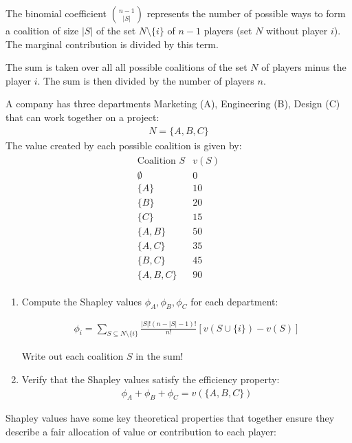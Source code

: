 The binomial coefficient $\binom{n-1}{|S|}$ represents the number of possible ways to form a coalition of size $|S|$ of the set $N \setminus \{i\}$ of $n-1$ players (set $N$ without player $i$). The marginal contribution is divided by this term. 

The sum is taken over all all possible coalitions of the set $N$ of players minus the player $i$. The sum is then divided by the number of players $n$.


\begin{exerciseboxpaper}
A company has three departments Marketing (A), Engineering (B), Design (C) that can work together on a project:
\begin{align*}
N=\{A,B,C\}
\end{align*}
The value created by each possible coalition is given by:
\begin{align*}
\begin{array}{c|c}
\text{Coalition } S & v(S) \\
\hline
\emptyset & 0 \\
\{A\} & 10 \\
\{B\} & 20 \\
\{C\} & 15 \\
\{A,B\} & 50 \\
\{A,C\} & 35 \\
\{B,C\} & 45 \\
\{A,B,C\} & 90
\end{array}
\end{align*}

\begin{enumerate}
    \item Compute the Shapley values $\phi_A,\phi_B,\phi_C $ for each department:

    \begin{align*}
       \phi_i
    =
    \sum_{S\subseteq N\setminus\{i\}}
    \frac{|S|!(n-|S|-1)!}{n!}
    \left[v(S\cup\{i\})-v(S)\right]
	\end{align*}
	
	Write out each coalition $S$ in the sum!
    \item Verify that the Shapley values satisfy the efficiency property:
\begin{align*}
    \phi_A+\phi_B+\phi_C=v(\{A,B,C\})
\end{align*}

\end{enumerate}
\end{exerciseboxpaper}

Shapley values have some key theoretical properties that together ensure they describe a fair allocation of value or contribution to each player:

